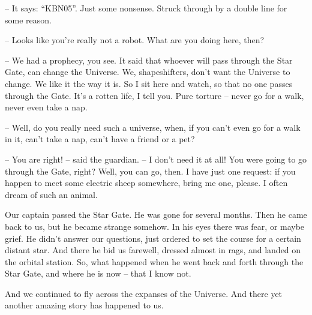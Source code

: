 \documentclass[ebook,twoside,final,openright]{memoir}
\begin{document}
– It says: “KBN05”. Just some nonsense. Struck through by a double line for some reason.\par
– Looks like you're really not a robot. What are you doing here, then?\par
– We had a prophecy, you see. It said that whoever will pass through the Star Gate, can change the Universe. We, shapeshifters, don’t want the Universe to change. We like it the way it is. So I sit here and watch, so that no one passes through the Gate. It’s a rotten life, I tell you. Pure torture – never go for a walk, never even take a nap.\par
– Well, do you really need such a universe, when, if you can’t even go for a walk in it, can’t take a nap, can’t have a friend or a pet?\par
– You are right! – said the guardian. – I don’t need it at all! You were going to go through the Gate, right? Well, you can go, then. I have just one request: if you happen to meet some electric sheep somewhere, bring me one, please. I often dream of such an animal.\par
Our captain passed the Star Gate. He was gone for several months. Then he came back to us, but he became strange somehow. In his eyes there was fear, or maybe grief. He didn’t answer our questions, just ordered to set the course for a certain distant star. And there he bid us farewell, dressed almost in rags, and landed on the orbital station. So, what happened when he went back and forth through the Star Gate, and where he is now – that I know not. \par
\par
 And we continued to fly across the expanses of the Universe. And there yet another amazing story has happened to us.
\end{document}
